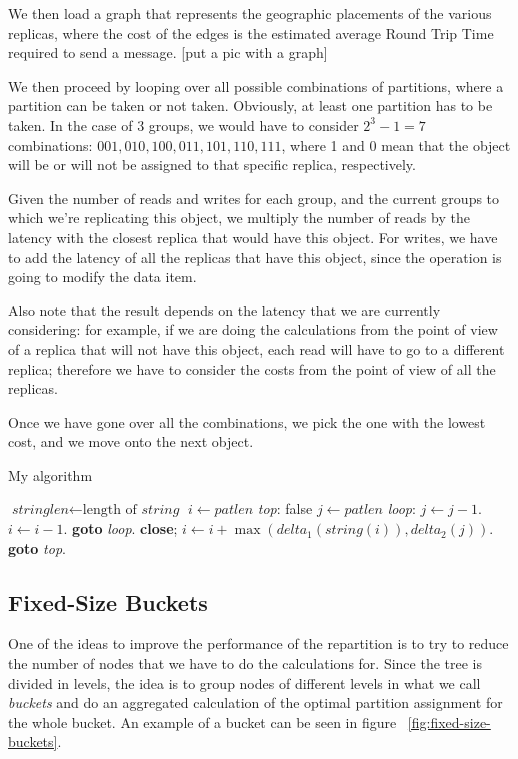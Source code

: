 We then load a graph that represents the geographic placements of the various replicas, where the cost of the edges is the estimated average Round Trip Time required to send a message.
[put a pic with a graph]

We then proceed by looping over all possible combinations of partitions, where a partition can be taken or not taken. Obviously, at least one partition has to be taken. In the case of 3 groups, we would have to consider $2^3 -1 = 7$ combinations: $001, 010, 100, 011, 101, 110, 111$, where 1 and 0 mean that the object will be or will not be assigned to that specific replica, respectively.

Given the number of reads and writes for each group, and the current groups to which we're replicating this object, we multiply the number of reads by the latency with the closest replica that would have this object. For writes, we have to add the latency of all the replicas that have this object, since the operation is going to modify the data item.

Also note that the result depends on the latency that we are currently considering: for example, if we are doing the calculations from the point of view of a replica that will not have this object, each read will have to go to a different replica; therefore we have to consider the costs from the point of view of all the replicas.

Once we have gone over all the combinations, we pick the one with the lowest cost, and we move onto the next object.

\begin{algorithm}
  \caption{My algorithm}\label{euclid}
  \begin{algorithmic}[1]
  \State $\textit{stringlen} \gets \text{length of }\textit{string}$
  \State $i \gets \textit{patlen}$
  \State \emph{top}:
   \Return false
  \EndIf
  \State $j \gets \textit{patlen}$
  \State \emph{loop}:
  \State $j \gets j-1$.
  \State $i \gets i-1$.
  \State \textbf{goto} \emph{loop}.
  \State \textbf{close};
  \EndIf
  \State $i \gets i+\max(\textit{delta}_1(\textit{string}(i)),\textit{delta}_2(j))$.
  \State \textbf{goto} \emph{top}.
  \EndProcedure
  \end{algorithmic}
  \end{algorithm}

\subsection{Fixed-Size Buckets}\label{sec:fixed-size buckets}
One of the ideas to improve the performance of the repartition is to try to reduce the number of nodes that we have to do the calculations for. Since the tree is divided in levels, the idea is to group nodes of different levels in what we call \emph{buckets} and do an aggregated calculation of the optimal partition assignment for the whole bucket. An example of a bucket can be seen in figure ~\ref{fig:fixed-size-buckets}.


